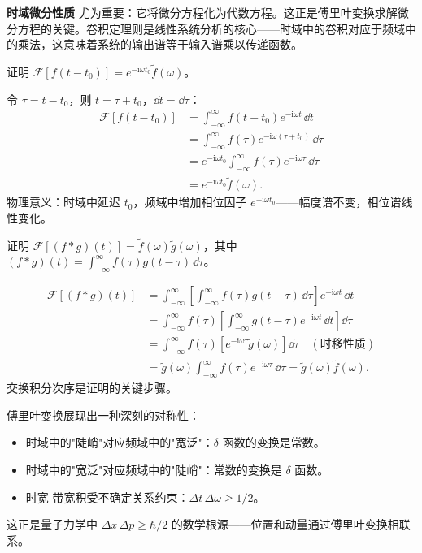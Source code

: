\textbf{时域微分性质} 尤为重要：它将微分方程化为代数方程。这正是傅里叶变换求解微分方程的关键。卷积定理则是线性系统分析的核心——时域中的卷积对应于频域中的乘法，这意味着系统的输出谱等于输入谱乘以传递函数。

\begin{example}
证明 $\mathcal{F}[f(t-t_0)] = e^{-\mathrm{i}\omega t_0}\tilde{f}(\omega)$。

令 $\tau = t - t_0$，则 $t = \tau + t_0$，$\dd t = \dd\tau$：
\begin{align*}
\mathcal{F}[f(t-t_0)]
&= \int_{-\infty}^{\infty} f(t-t_0) e^{-\mathrm{i}\omega t}\,\dd t \\
&= \int_{-\infty}^{\infty} f(\tau) e^{-\mathrm{i}\omega(\tau+t_0)}\,\dd\tau \\
&= e^{-\mathrm{i}\omega t_0}\int_{-\infty}^{\infty} f(\tau) e^{-\mathrm{i}\omega\tau}\,\dd\tau \\
&= e^{-\mathrm{i}\omega t_0}\tilde{f}(\omega).
\end{align*}
物理意义：时域中延迟 $t_0$，频域中增加相位因子 $e^{-\mathrm{i}\omega t_0}$——幅度谱不变，相位谱线性变化。
\end{example}

\begin{example}
证明 $\mathcal{F}[(f*g)(t)] = \tilde{f}(\omega)\tilde{g}(\omega)$，其中 $(f*g)(t) = \int_{-\infty}^{\infty} f(\tau)g(t-\tau)\,\dd\tau$。

\begin{align*}
\mathcal{F}[(f*g)(t)]
&= \int_{-\infty}^{\infty} \left[\int_{-\infty}^{\infty} f(\tau)g(t-\tau)\,\dd\tau\right] e^{-\mathrm{i}\omega t}\,\dd t \\
&= \int_{-\infty}^{\infty} f(\tau)\left[\int_{-\infty}^{\infty} g(t-\tau) e^{-\mathrm{i}\omega t}\,\dd t\right]\dd\tau \\
&= \int_{-\infty}^{\infty} f(\tau)\left[e^{-\mathrm{i}\omega\tau}\tilde{g}(\omega)\right]\dd\tau \quad(\text{时移性质}) \\
&= \tilde{g}(\omega)\int_{-\infty}^{\infty} f(\tau) e^{-\mathrm{i}\omega\tau}\,\dd\tau
= \tilde{g}(\omega)\tilde{f}(\omega).
\end{align*}
交换积分次序是证明的关键步骤。
\end{example}

\begin{insight}[时频对偶的物理美感]
傅里叶变换展现出一种深刻的对称性：
\begin{itemize}
\item 时域中的"陡峭"对应频域中的"宽泛"：$\delta$ 函数的变换是常数。
\item 时域中的"宽泛"对应频域中的"陡峭"：常数的变换是 $\delta$ 函数。
\item 时宽-带宽积受不确定关系约束：$\Delta t\,\Delta\omega \geq 1/2$。
\end{itemize}
这正是量子力学中 $\Delta x\,\Delta p \geq \hbar/2$ 的数学根源——位置和动量通过傅里叶变换相联系。
\end{insight}

